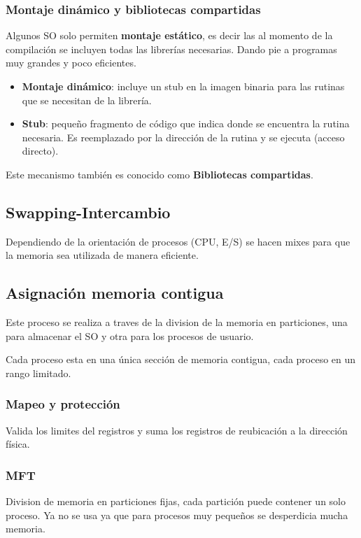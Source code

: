 \documentclass{templateNote}
\begin{document}
\subsubsection*{Montaje dinámico y bibliotecas compartidas}
Algunos SO solo permiten \textbf{montaje estático}, es decir las al momento de la compilación se incluyen todas las librerías necesarias. Dando pie a programas muy grandes y poco eficientes.

\begin{itemize}
    \item \textbf{Montaje dinámico}: incluye un stub en la imagen binaria para las rutinas que se necesitan de la librería.
    \item \textbf{Stub}: pequeño fragmento de código que indica donde se encuentra la rutina necesaria. Es reemplazado por la dirección de la rutina y se ejecuta (acceso directo).
\end{itemize}

\noindent Este mecanismo también es conocido como \textbf{Bibliotecas compartidas}.

\subsection*{Swapping-Intercambio}

Dependiendo de la orientación de procesos (CPU, E/S) se hacen mixes para que la memoria sea utilizada de manera eficiente.

\subsection*{Asignación memoria contigua}

Este proceso se realiza a traves de la division de la memoria en particiones, una para almacenar el SO y otra para los procesos de usuario.

Cada proceso esta en una única sección de memoria contigua, cada proceso en un rango limitado.

\subsubsection*{Mapeo y protección}
Valida los limites del registros y suma los registros de reubicación a la dirección física.

\subsubsection*{MFT}
Division de memoria en particiones fijas, cada partición puede contener un solo proceso.
Ya no se usa ya que para procesos muy pequeños se desperdicia mucha memoria.
\end{document}
